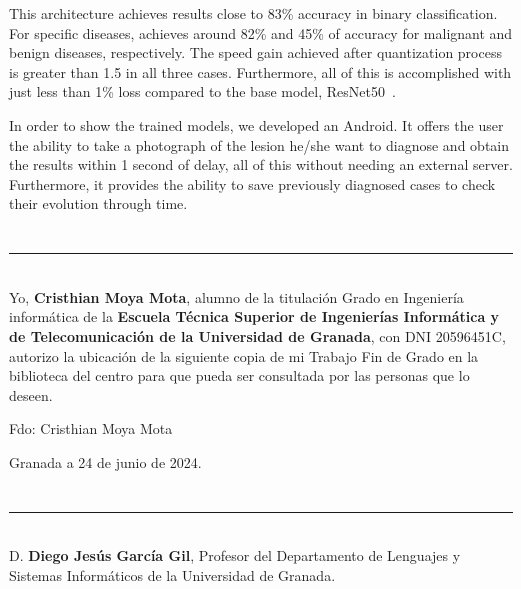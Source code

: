 This architecture achieves results close to 83\% accuracy in binary classification. For specific diseases, achieves around 82\% and 45\% of accuracy for malignant and benign diseases, respectively. The speed gain achieved after quantization process is greater than 1.5 in all three cases. Furthermore, all of this is accomplished with just less than 1\% loss compared to the base model, ResNet50~\cite{he2015deep}.

In order to show the trained models, we developed an Android. It offers the user the ability to take a photograph of the lesion he/she want to diagnose and obtain the results within 1 second of delay, all of this without needing an external server. Furthermore, it provides the ability to save previously diagnosed cases to check their evolution through time.


\chapter*{}
\thispagestyle{empty}

\noindent\rule[-1ex]{\textwidth}{2pt}\\[4.5ex]

Yo, \textbf{Cristhian Moya Mota}, alumno de la titulación Grado en Ingeniería informática de la \textbf{Escuela Técnica Superior
de Ingenierías Informática y de Telecomunicación de la Universidad de Granada}, con DNI 20596451C, autorizo la
ubicación de la siguiente copia de mi Trabajo Fin de Grado en la biblioteca del centro para que pueda ser
consultada por las personas que lo deseen.

\vspace{6cm}

\noindent Fdo: Cristhian Moya Mota

\vspace{2cm}

\begin{flushright}
Granada a 24 de junio de 2024.
\end{flushright}


\chapter*{}
\thispagestyle{empty}

\noindent\rule[-1ex]{\textwidth}{2pt}\\[4.5ex]

D. \textbf{Diego Jesús García Gil}, Profesor del Departamento de Lenguajes y Sistemas Informáticos de la Universidad de Granada.

